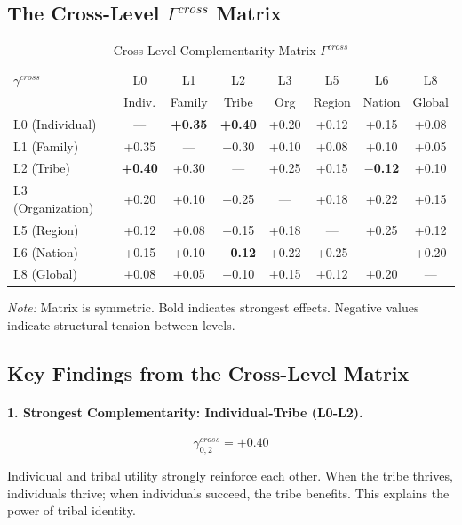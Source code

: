\subsection{The Cross-Level $\Gamma^{cross}$ Matrix}

\begin{table}[htbp]
\centering
\caption{Cross-Level Complementarity Matrix $\Gamma^{cross}$}
\label{tab:aaa-cross-gamma}
\renewcommand{\arraystretch}{1.4}
\small
\begin{tabular}{@{}l|ccccccc@{}}
\toprule
$\gamma^{cross}$ & L0 & L1 & L2 & L3 & L5 & L6 & L8 \\
& Indiv. & Family & Tribe & Org & Region & Nation & Global \\
\midrule
L0 (Individual) & --- & \textbf{+0.35} & \textbf{+0.40} & +0.20 & +0.12 & +0.15 & +0.08 \\
L1 (Family) & +0.35 & --- & +0.30 & +0.10 & +0.08 & +0.10 & +0.05 \\
L2 (Tribe) & \textbf{+0.40} & +0.30 & --- & +0.25 & +0.15 & \textbf{$-$0.12} & +0.10 \\
L3 (Organization) & +0.20 & +0.10 & +0.25 & --- & +0.18 & +0.22 & +0.15 \\
L5 (Region) & +0.12 & +0.08 & +0.15 & +0.18 & --- & +0.25 & +0.12 \\
L6 (Nation) & +0.15 & +0.10 & \textbf{$-$0.12} & +0.22 & +0.25 & --- & +0.20 \\
L8 (Global) & +0.08 & +0.05 & +0.10 & +0.15 & +0.12 & +0.20 & --- \\
\bottomrule
\end{tabular}
\begin{flushleft}
\small\textit{Note:} Matrix is symmetric. Bold indicates strongest effects.
Negative values indicate structural tension between levels.
\end{flushleft}
\end{table}

\subsection{Key Findings from the Cross-Level Matrix}

\paragraph{1. Strongest Complementarity: Individual-Tribe (L0-L2).}
$$\gamma^{cross}_{0,2} = +0.40$$

Individual and tribal utility strongly reinforce each other. When the tribe
thrives, individuals thrive; when individuals succeed, the tribe benefits.
This explains the power of tribal identity.

